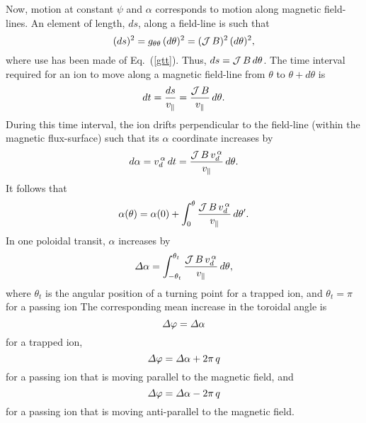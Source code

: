 \documentclass[12pt,prb,aps,notitlepage]{revtex4-1}
\begin{document}
 Now, motion at constant $\psi$ and $\alpha$ corresponds to motion along magnetic field-lines. An element of length, $ds$, along
 a field-line is such that
 \begin{equation}
 (ds)^2 = g_{\theta\theta}\,(d\theta)^2= ({\cal J}\,B)^2\,(d\theta)^2,
 \end{equation}
 where use has been made of Eq.~(\ref{gtt}). Thus, $ds = {\cal J}\,B\,d\theta$. The time interval required for an ion to move along a
 magnetic field-line from $\theta$ to $\theta+d\theta$ is
 \begin{equation}\label{dt}
 dt = \frac{ds}{v_\parallel} =\frac{{\cal J}\,B}{v_\parallel}\,d\theta.
 \end{equation}
 During this time interval, the ion drifts perpendicular to the field-line (within the magnetic flux-surface) such that its $\alpha$ coordinate
 increases by
 \begin{equation}
 d\alpha =v_d^{\,\alpha}\,dt =\frac{{\cal J}\,B\,v_d^{\,\alpha}}{v_\parallel}\,d\theta.
 \end{equation}
 It follows that
 \begin{equation}
 \alpha(\theta)= \alpha(0) + \int_0^\theta\frac{{\cal J}\,B\,v_d^{\,\alpha}}{v_\parallel}\,d\theta'.
 \end{equation}
  In one poloidal transit, $\alpha$ increases by
 \begin{equation}
 {\mit\Delta}\alpha = \int_{-\theta_t}^{\theta_t}\frac{{\cal J}\,B\,v_d^{\,\alpha}}{v_\parallel}\,d\theta,
 \end{equation}
 where $\theta_t$ is the angular position of a turning point for a trapped ion, and $\theta_t=\pi$ for a passing ion 
 The corresponding mean increase in the toroidal angle is
 \begin{equation}
 {\mit\Delta}\varphi = {\mit\Delta}\alpha
 \end{equation}
 for a trapped ion, 
 \begin{equation}
 {\mit\Delta}\varphi = {\mit\Delta}\alpha+ 2\pi\,q
 \end{equation}
 for a passing ion  that is moving parallel to the magnetic field, and 
 \begin{equation}
 {\mit\Delta}\varphi = {\mit\Delta}\alpha- 2\pi\,q
 \end{equation}
 for a passing ion that is moving anti-parallel to the magnetic field. 
 
\end{document}
